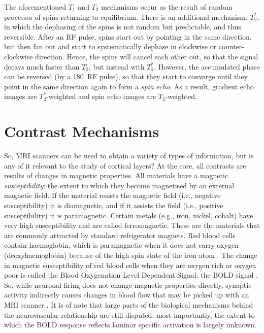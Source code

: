 The aforementioned $T_1$ and $T_2$ mechanisms occur as the result of random processes of spins returning to equilibrium. There is an additional mechanism, $T_2^*$, in which the dephasing of the spins is not random but predictable, and thus reversible. After an RF pulse, spins start out by pointing in the same direction, but then fan out and start to systematically dephase in clockwise or counter-clockwise direction. Hence, the spins will cancel each other out, so that the signal decays much faster than $T_2$, but instead with $T_2^*$. However, the accumulated phase can be reversed (by a 180\textdegree~RF pulse), so that they start to converge until they point in the same direction again to form a \emph{spin echo}. As a result, gradient echo images are $T_2^*$-weighted and spin echo images are $T_2$-weighted.

\section*{Contrast Mechanisms}
So, MRI scanners can be used to obtain a variety of types of information, but is any of it relevant to the study of cortical layers? At the core, all contrasts are results of changes in magnetic properties. All materials have a magnetic \emph{susceptibility}: the extent to which they become magnetised by an external magnetic field. If the material resists the magnetic field (i.e., negative susceptibility) it is diamagnetic, and if it assists the field (i.e., positive susceptibility) it is paramagnetic. Certain metals (e.g., iron, nickel, cobalt) have very high susceptibility and are called ferromagnetic. These are the materials that are commonly attracted by standard refrigerator magnets. Red blood cells contain haemoglobin, which is paramagnetic when it does not carry oxygen (deoxyhaemoglobin) because of the high spin state of the iron atom \cite{Pauling1936}. The change in magnetic susceptibility of red blood cells when they are oxygen rich or oxygen poor is called the Blood Oxygenation Level Dependent Signal: the BOLD signal \cite{Ogawa1990}. So, while neuronal firing does not change magnetic properties directly, synaptic activity indirectly causes changes in blood flow that may be picked up with an MRI scanner \cite{Logothetis2001}. It is of note that large parts of the biological mechanisms behind the neurovascular relationship are still disputed; most importantly, the extent to which the BOLD response reflects laminar specific activation is largely unknown.

